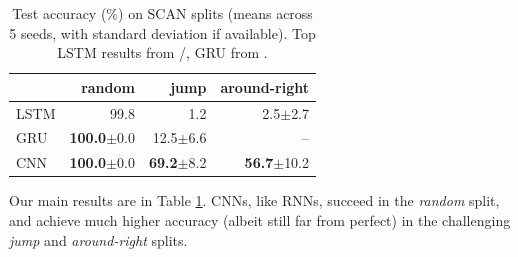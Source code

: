 \begin{table}[tb]
  \begin{footnotesize}
    \begin{center}
          \begin{tabular}{l | r | r | r}
             & \textbf{random} & \textbf{jump} & \textbf{around-right} \\ \hline
             LSTM & 99.8 & 1.2 & 2.5$\pm$2.7 \\
             GRU & \textbf{100.0}$\pm$0.0 & 12.5$\pm$6.6 & --  \\
             \hline
              CNN & \textbf{100.0}$\pm$0.0 & \textbf{69.2}$\pm$8.2 & \textbf{56.7}$\pm$10.2 \\
          \end{tabular} 
    \end{center}
  \end{footnotesize}
  \caption{Test accuracy (\%) on SCAN splits (means across 5 seeds,
    with standard deviation if available). Top LSTM results from
    /, GRU from
      .}
\label{table:main_results} 
\end{table}

Our main results are in Table \ref{table:main_results}. CNNs, like
RNNs, succeed in the \emph{random} split, and achieve much higher accuracy (albeit still far from perfect)  in the challenging \emph{jump} and \emph{around-right}
splits.

